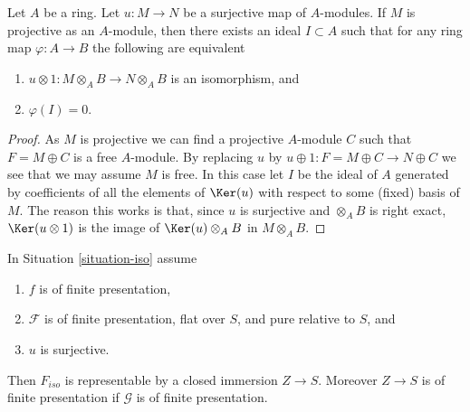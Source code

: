 \begin{lemma}
\label{lemma-flattening-module-map}
Let $A$ be a ring. Let $u : M \to N$ be a surjective map of $A$-modules.
If $M$ is projective as an $A$-module, then there exists an ideal
$I \subset A$ such that for any ring map $\varphi : A \to B$
the following are equivalent
\begin{enumerate}
\item $u \otimes 1 : M \otimes_A B \to N \otimes_A B$ is an
isomorphism, and
\item $\varphi(I) = 0$.
\end{enumerate}
\end{lemma}

\begin{proof}
As $M$ is projective we can find a projective $A$-module $C$
such that $F = M \oplus C$ is a free $A$-module.
By replacing $u$ by $u \oplus 1 : F = M \oplus C \to N \oplus C$
we see that we may assume $M$ is free. In this case let $I$ be
the ideal of $A$ generated by coefficients of all the elements of
$\Ker(u)$ with respect to some (fixed) basis of $M$.
The reason this works is that, since $u$ is surjective and
$\otimes_A B$ is right exact, $\Ker(u \otimes 1)$ is
the image of $\Ker(u) \otimes_A B$ in $M \otimes_A B$.
\end{proof}

\begin{theorem}
\label{theorem-flattening-map}
In
Situation \ref{situation-iso}
assume
\begin{enumerate}
\item $f$ is of finite presentation,
\item $\mathcal{F}$ is of finite presentation, flat over $S$, and
pure relative to $S$, and
\item $u$ is surjective.
\end{enumerate}
Then $F_{iso}$ is representable by a closed immersion $Z \to S$.
Moreover $Z \to S$ is of finite presentation if $\mathcal{G}$ is
of finite presentation.
\end{theorem}

